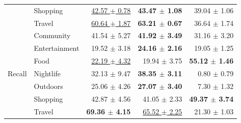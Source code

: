 \begin{table}[htbp]
\begin{tabular}{llrrr}
                           & Shopping      & \underline{42.57 $\pm$ 0.78} & \textbf{43.47 $\pm$ 1.08}    & 39.04 $\pm$ 1.06 \\
                           & Travel        & \underline{60.64 $\pm$ 1.87} & \textbf{63.21 $\pm$ 0.67}    & 36.64 $\pm$ 1.74 \\
\midrule
\multirow{7}{*}{Recall}    & Community     & 41.54 $\pm$ 5.27             & \textbf{41.92 $\pm$ 3.49}    & 31.16 $\pm$ 3.20 \\
                           & Entertainment & 19.52 $\pm$ 3.18             & \textbf{24.16 $\pm$ 2.16}    & 19.05 $\pm$ 1.25 \\
                           & Food          & \underline{22.19 $\pm$ 4.32} & 19.94 $\pm$ 3.75             & \textbf{55.12 $\pm$ 1.46} \\
                           & Nightlife     & 32.13 $\pm$ 9.47             & \textbf{38.35 $\pm$ 3.11}    & 0.80 $\pm$ 0.79 \\
                           & Outdoors      & 25.06 $\pm$ 4.26             & \textbf{27.07 $\pm$ 3.40}    & 7.30 $\pm$ 1.32 \\
                           & Shopping      & 42.87 $\pm$ 4.56             & 41.05 $\pm$ 2.33             & \textbf{49.37 $\pm$ 3.74} \\
                           & Travel        & \textbf{69.36 $\pm$ 4.15}    & \underline{65.52 $\pm$ 2.25} & 21.30 $\pm$ 1.03 \\
\bottomrule
\end{tabular}
\end{table}
